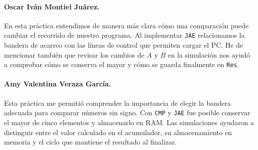 \documentclass[letterpaper,12pt]{article}
\begin{document}
\paragraph{Oscar Iván Montiel Juárez.} En esta práctica entendimos de manera más clara cómo una comparación puede cambiar el recorrido de nuestro programa. Al implementar \texttt{JAE} relacionamos la bandera de acarreo con las líneas de control que permiten cargar el PC. He de mencionar también que revisar los cambios de $A$ y $B$ en la simulación nos ayudó a comprobar cómo se conserva el mayor y cómo se guarda finalmente en \texttt{Res}.

\paragraph{Amy Valentina Veraza García.} Esta práctica me permitió comprender la importancia de elegir la bandera adecuada para comparar números sin signo. Con \texttt{CMP} y \texttt{JAE} fue posible conservar el mayor de cinco elementos y almacenarlo en RAM. Las simulaciones ayudaron a distinguir entre el valor calculado en el acumulador, su almacenamiento en memoria y el ciclo que mantiene el resultado al finalizar.
\end{document}
